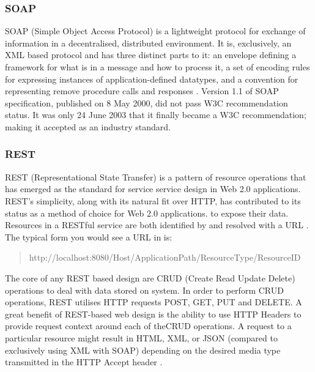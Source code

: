 \subsubsection{SOAP}
SOAP (Simple Object Access Protocol) is a lightweight protocol for exchange of information in a decentralised, distributed environment.
It is, exclusively, an XML based protocol and has three distinct parts to it: an envelope defining a framework for what is in a message and how to process it, 
a set of encoding rules for expressing instances of application-defined datatypes, and a convention for representing remove procedure calls and responses \cite{box2000simple}.
Version 1.1 of SOAP specification, published on 8 May 2000, did not pass W3C recommendation status. It was only 24 June 2003 that it finally became a W3C recommendation;
making it accepted as an industry standard. 

\subsubsection{REST}
REST (Representational State Transfer) is a pattern of resource operations that has emerged as the standard for service service design in Web 2.0 applications.
REST’s simplicity, along with its natural fit over HTTP, has contributed to its status as a method of choice for Web 2.0 applications.
to expose their data. 
Resources in a RESTful service are both identified by and resolved with a URL \cite{battle2008bridging}.
The typical form you would see a URL in is: 

\begin{quotation}
    http://localhost:8080/Host/ApplicationPath/ResourceType/ResourceID
\end{quotation}

The core of any REST based design are CRUD (Create Read Update Delete) operations to deal with data stored on system.
In order to perform CRUD operations, REST utilises HTTP requests POST, GET, PUT and DELETE.
A great benefit of REST-based web design is the ability to use HTTP Headers to provide request context around each of theCRUD operations.
A request to a particular resource might result in HTML, XML, or JSON (compared to exclusively using XML with SOAP) depending on the desired
media type transmitted in the HTTP Accept header \cite{battle2008bridging}.

